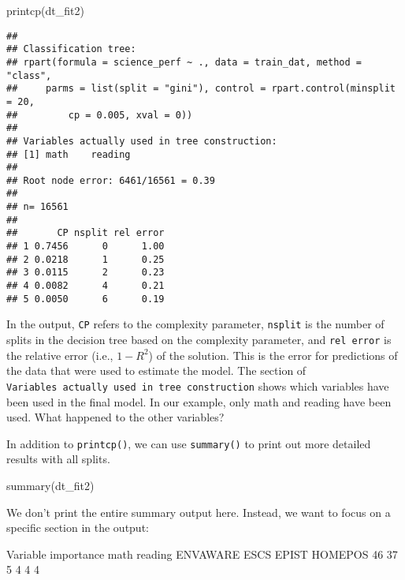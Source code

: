 \documentclass[
]{book}
\newenvironment{Shaded}{\begin{snugshade}}{\end{snugshade}}
\newcommand{\DecValTok}[1]{\textcolor[rgb]{0.00,0.00,0.81}{#1}}
\newcommand{\FunctionTok}[1]{\textcolor[rgb]{0.00,0.00,0.00}{#1}}
\newcommand{\NormalTok}[1]{#1}
\begin{document}
\begin{Shaded}
\begin{Highlighting}[]
\FunctionTok{printcp}\NormalTok{(dt\_fit2)}
\end{Highlighting}
\end{Shaded}

\begin{verbatim}
## 
## Classification tree:
## rpart(formula = science_perf ~ ., data = train_dat, method = "class", 
##     parms = list(split = "gini"), control = rpart.control(minsplit = 20, 
##         cp = 0.005, xval = 0))
## 
## Variables actually used in tree construction:
## [1] math    reading
## 
## Root node error: 6461/16561 = 0.39
## 
## n= 16561 
## 
##       CP nsplit rel error
## 1 0.7456      0      1.00
## 2 0.0218      1      0.25
## 3 0.0115      2      0.23
## 4 0.0082      4      0.21
## 5 0.0050      6      0.19
\end{verbatim}

In the output, \texttt{CP} refers to the complexity parameter, \texttt{nsplit} is the number of splits in the decision tree based on the complexity parameter, and \texttt{rel\ error} is the relative error (i.e., \(1 - R^2\)) of the solution. This is the error for predictions of the data that were used to estimate the model. The section of \texttt{Variables\ actually\ used\ in\ tree\ construction} shows which variables have been used in the final model. In our example, only math and reading have been used. What happened to the other variables?

In addition to \texttt{printcp()}, we can use \texttt{summary()} to print out more detailed results with all splits.

\begin{Shaded}
\begin{Highlighting}[]
\FunctionTok{summary}\NormalTok{(dt\_fit2)}
\end{Highlighting}
\end{Shaded}

We don't print the entire summary output here. Instead, we want to focus on a specific section in the output:

\begin{Shaded}
\begin{Highlighting}[]
\NormalTok{Variable importance}
\NormalTok{    math  reading ENVAWARE     ESCS    EPIST  HOMEPOS }
      \DecValTok{46}       \DecValTok{37}        \DecValTok{5}        \DecValTok{4}        \DecValTok{4}        \DecValTok{4}  
\end{Highlighting}
\end{Shaded}
\end{document}
